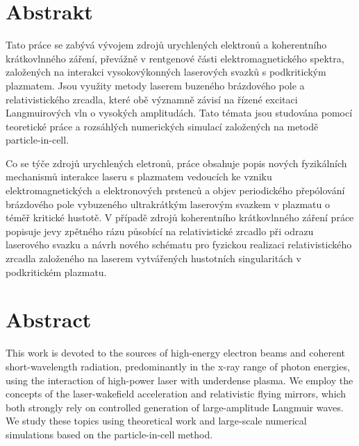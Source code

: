 \documentclass[10pt, a4paper, twoside, openright]{report}
\begin{document}




\chapter*{Abstrakt}
\thispagestyle{empty}

Tato práce se zabývá vývojem zdrojů urychlených elektronů a koherentního krátkovlnného záření, převážně v rentgenové části elektromagnetického spektra, založených na interakci vysokovýkonných laserových svazků s podkritickým plazmatem. Jsou využity metody laserem buzeného brázdového pole a relativistického zrcadla, které obě významně závisí na řízené excitaci Langmuirových vln o vysokých amplitudách. Tato témata jsou studována pomocí teoretické práce a rozsáhlých numerických simulací založených na metodě particle-in-cell.

Co se týče zdrojů urychlených eletronů, práce obsahuje popis nových fyzikálních mechanismů interakce laseru s plazmatem vedoucích ke vzniku elektromagnetických a elektronových prstenců a objev periodického přepólování brázdového pole vybuzeného ultrakrátkým laserovým svazkem v plazmatu o téměř kritické hustotě. V případě zdrojů koherentního krátkovlnného záření práce popisuje jevy zpětného rázu působící na relativistické zrcadlo při odrazu laserového svazku a návrh nového schématu pro fyzickou realizaci relativistického zrcadla založeného na laserem vytvářených hustotních singularitách v podkritickém plazmatu.

{\let\clearpage\relax\chapter*{Abstract}}
\thispagestyle{empty}

\noindent This work is devoted to the sources of high-energy electron beams and coherent short-wavelength radiation, predominantly in the x-ray range of photon energies, using the interaction of high-power laser with underdense plasma. We employ the concepts of the laser-wakefield acceleration and relativistic flying mirrors, which both strongly rely on controlled generation of large-amplitude Langmuir waves. We study these topics using theoretical work and large-scale numerical simulations based on the particle-in-cell method. 
\end{document}
